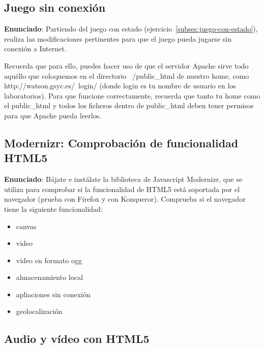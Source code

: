 \subsection{Juego sin conexión}
\label{subsec:juego-sin-conexion}

\textbf{Enunciado}: Partiendo del juego con estado (ejercicio~\ref{subsec:juego-con-estado}), realiza las modificaciones pertinentes para que el juego pueda jugarse sin conexión a Internet.

Recuerda que para ello, puedes hacer uso de que el servidor Apache sirve todo aquéllo que coloquemos en el directorio ~/public\_html de nuestro home, como http://watson.gsyc.es/~login/ (donde login es tu nombre de usuario en los laboratorios). Para que funcione correctamente, recuerda que tanto tu home como el public\_html y todos los ficheros dentro de public\_html deben tener permisos para que Apache pueda leerlos.

\subsection{Modernizr: Comprobación de funcionalidad HTML5}
\label{subsec:modernizr}

\textbf{Enunciado}: Bájate e instálate la biblioteca de Javascript Modernizr, que se utiliza para comprobar si la funcionalidad de HTML5 está soportada por el navegador (prueba con Firefox y con Konqueror). Comprueba si el navegador tiene la siguiente funcionalidad:

\begin{itemize}
  \item canvas
  \item video
  \item video en formato ogg
  \item almacenamiento local
  \item apliaciones sin conexión
  \item geolocalización
\end{itemize}  


\subsection{Audio y vídeo con HTML5}
\label{subsec:audio-video}

